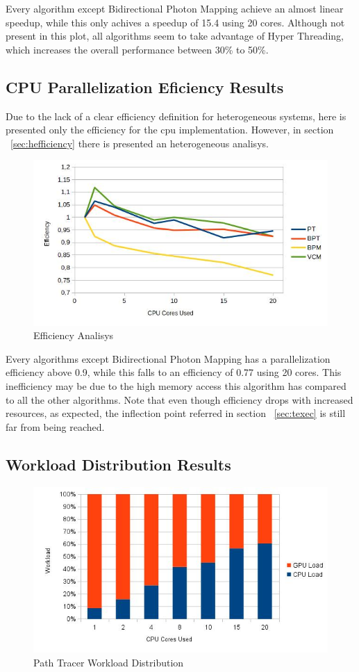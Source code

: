 Every algorithm except Bidirectional Photon Mapping achieve an almost linear speedup, while this only achives a speedup of 15.4 using 20 cores. Although not present in this plot, all algorithms seem to take advantage of Hyper Threading, which increases the overall performance between 30\% to 50\%.

\subsection{CPU Parallelization Eficiency Results}

Due to the lack of a clear efficiency definition for heterogeneous systems, here is presented only the efficiency for the \gls{cpu} implementation. However, in section ~\ref{sec:hefficiency} there is presented an heterogeneous analisys.

\begin{figure}[H]
\centering
\includegraphics[width=0.8\linewidth]{img/efficiency.jpg}
\caption{\label{img:efficiency} Efficiency Analisys}
\end{figure}

Every algorithms except Bidirectional Photon Mapping has a parallelization efficiency above 0.9, while this falls to an efficiency of 0.77 using 20 cores. This inefficiency may be due to the high memory access this algorithm has compared to all the other algorithms. Note that even though efficiency drops with increased resources, as expected, the inflection point referred in section ~\ref{sec:texec} is still far from being reached.

\subsection{Workload Distribution Results}

\begin{figure}[H]
\centering
\includegraphics[width=0.8\linewidth]{img/ptwl.jpg}
\caption{\label{img:ptwl} Path Tracer Workload Distribution}
\end{figure}

